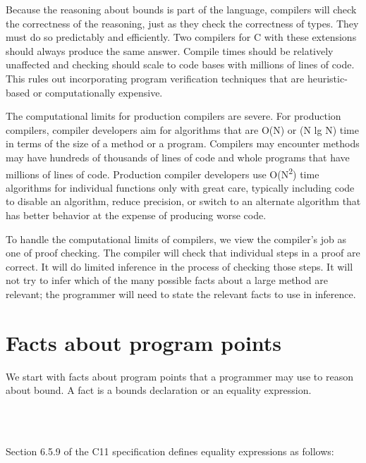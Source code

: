 Because the reasoning about bounds is part of the language, compilers
will check the correctness of the reasoning, just as they check the
correctness of types. They must do so predictably and efficiently. Two
compilers for C with these extensions should always produce the same
answer. Compile times should be relatively unaffected and checking
should scale to code bases with millions of lines of code. This rules
out incorporating program verification techniques that are
heuristic-based or computationally expensive.

The computational limits for production compilers are severe. For
production compilers, compiler developers aim for algorithms that are
O(N) or (N lg N) time in terms of the size of a method or a program.
Compilers may encounter methods may have hundreds of thousands of lines
of code and whole programs that have millions of lines of code.
Production compiler developers use O(N\textsuperscript{2}) time
algorithms for individual functions only with great care, typically
including code to disable an algorithm, reduce precision, or switch to
an alternate algorithm that has better behavior at the expense of
producing worse code.

To handle the computational limits of compilers, we view the compiler's
job as one of proof checking. The compiler will check that individual
steps in a proof are correct. It will do limited inference in the
process of checking those steps. It will not try to infer which of the
many possible facts about a large method are relevant; the programmer
will need to state the relevant facts to use in inference.

\section{Facts about program points}

We start with facts about program points that a programmer may use to reason
about bound.  A fact is a bounds declaration or an equality expression.

\begin{tabbing}
\=\\
\> \\
\>
\end{tabbing}

Section 6.5.9 of the C11 specification defines equality expressions as follows:

\begin{tabbing}
\=\\
\> \\
\> \\
\>
\end{tabbing}

